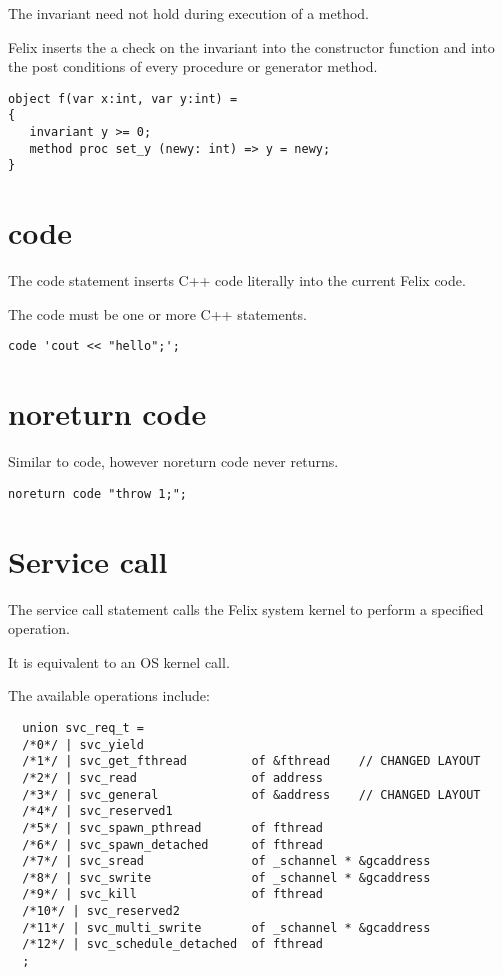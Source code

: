 \documentclass[oneside]{book}
\begin{document}
{The invariant need not hold during execution of a method.

Felix inserts the a check on the invariant into the constructor function
and into the post conditions of every procedure or generator
method.


\begin{verbatim}
object f(var x:int, var y:int) =
{
   invariant y >= 0;
   method proc set_y (newy: int) => y = newy;
}
\end{verbatim}


\section{code}
The code statement inserts C++ code literally into the current
Felix code.

The code must be one or more C++ statements.


\begin{verbatim}
code 'cout << "hello";';
\end{verbatim}


\section{noreturn code}
Similar to code, however noreturn code never returns.

\begin{verbatim}
noreturn code "throw 1;";
\end{verbatim}


\section{Service call}
The service call statement calls the Felix system kernel
to perform a specified operation.

It is equivalent to an OS kernel call.

The available operations include:

\begin{verbatim}
  union svc_req_t =
  /*0*/ | svc_yield
  /*1*/ | svc_get_fthread         of &fthread    // CHANGED LAYOUT
  /*2*/ | svc_read                of address
  /*3*/ | svc_general             of &address    // CHANGED LAYOUT
  /*4*/ | svc_reserved1
  /*5*/ | svc_spawn_pthread       of fthread
  /*6*/ | svc_spawn_detached      of fthread
  /*7*/ | svc_sread               of _schannel * &gcaddress
  /*8*/ | svc_swrite              of _schannel * &gcaddress
  /*9*/ | svc_kill                of fthread
  /*10*/ | svc_reserved2
  /*11*/ | svc_multi_swrite       of _schannel * &gcaddress 
  /*12*/ | svc_schedule_detached  of fthread
  ;
\end{verbatim}


}
\end{document}
